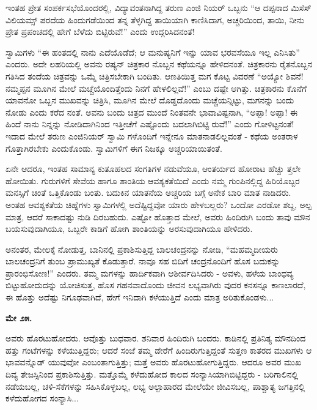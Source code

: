 ಇಂತಹ ಪ್ರೇತ ಸಂಪರ್ಕಸಭೆಯೊಂದರಲ್ಲಿ, ವಿದ್ಯಾವಂತನಾಗಿದ್ದ ತರುಣ ಎಂಜಿ ನಿಯರ್ ಒಬ್ಬನು “ಆ ದಪ್ಪನಾದ ಮಿಸೆಸ್ ವಿಲಿಯಮ್ಸ್ ಪರದೆಯ ಹಿಂದುಗಡೆಯಿಂದ ತನ್ನ ತೆಳ್ಳಗಿದ್ದ ತಾಯಿಯಾಗಿ ಕಾಣಿಸಿದಾಗ, ಅಚ್ಚರಿಯಿಂದ, ತಾಯಿ, ನೀನು ಪ್ರೇತ ಪ್ರಪಂಚದಲ್ಲಿ ಹೇಗೆ ಬೆಳೆದು ಬಿಟ್ಟಿರುವೆ!” ಎಂದು ಉದ್ಗರಿಸಿದನಂತೆ!

ಸ್ವಾಮಿಗಳು “ಈ ಹಂತದಲ್ಲಿ ನಾನು ಎದೆಯೊಡೆದೆ; ಆ ಮನುಷ್ಯನಿಗೆ ಇನ್ನು ಯಾವ ಭರವಸೆಯೂ ಇಲ್ಲ ಎನಿಸಿತು” ಎಂದರು. ಅದೇ ಲಹರಿಯಲ್ಲಿ ಅವನು ರಷ್ಯನ್ ಚಿತ್ರಕಾರ ನೊಬ್ಬನ ಕಥೆಯನ್ನೂ ಹೇಳಿದನಂತೆ. ಚಿತ್ರಕಾರನು ರೈತನೊಬ್ಬನ ಗತಿಸಿದ ತಂದೆಯ ಚಿತ್ರವನ್ನು ಒಮ್ಮೆ ಚಿತ್ರಿಸಬೇಕಾಗಿ ಬಂದಿತು. ಆಣತಿಯಿತ್ತ ಮಗ ಕೊಟ್ಟ ವಿವರಣೆ “ಅಯ್ಯೋ ಶಿವನೆ! ನಮ್ಮಪ್ಪನ ಮೂಗಿನ ಮೇಲೆ ಮಚ್ಚೆಯೊಂದಿತ್ತೆಂದು ನಿನಗೆ ಹೇಳಲಿಲ್ಲವೆ!” ಎಂಬು ದಷ್ಟೇ ಆಗಿತ್ತು. ಚಿತ್ರಕಾರನು ಕೊನೆಗೆ ಯಾವನೋ ಒಬ್ಬನ ಮುಖವನ್ನು ಚಿತ್ರಿಸಿ, ಮೂಗಿನ ಮೇಲೆ ದೊಡ್ಡದೊಂದು ಮಚ್ಚೆಯನ್ನಿಟ್ಟು, ಮಗನನ್ನು ಬಂದು ನೋಡು ಎಂದು ಕರೆದ ನಂತೆ. ಅವನು ಬಂದು ಚಿತ್ರದ ಮುಂದೆ ನಿಂತವನೇ ಭಾವಾವಿಷ್ಟನಾಗಿ, “ಅಪ್ಪಾ! ಅಪ್ಪಾ! ಈ ಹಿಂದೆ ನಾನು ನಿನ್ನನ್ನು ನೋಡಿದಾಗಿನಿಂದ ಇತ್ತೀಚೆಗೆ ಎಷ್ಟೊಂದು ಬದಲಾಗಿಬಿಟ್ಟಿ ರುವೆ!” ಎಂದು ಗೋಳಿಟ್ಟನಂತೆ! ಇದಾದ ಮೇಲೆ ತರುಣ ಎಂಜಿನಿಯರ್ ಸ್ವಾಮಿ ಗಳೊಂದಿಗೆ ಇನ್ನೇನೂ ಮಾತನಾಡಲಿಲ್ಲವಂತೆ - ಕಥೆಯ ಅಂತರಾಳ ಗೊತ್ತಾಗಿರಬೇಕು ಎಂದುಕೊಂಡು. ಸ್ವಾಮಿಗಳಿಗೆ ಈಗ ನಿಜಕ್ಕೂ ಅಚ್ಚರಿಯಾಯಿತಂತೆ.

ಏನೇ ಆದರೂ, ಇಂತಹ ಸಾಮಾನ್ಯ ಕುತೂಹಲದ ಸಂಗತಿಗಳ ನಡುವೆಯೂ, ಆಂತರ್ಯದ ಹೋರಾಟ ಹೆಚ್ಚು ತ್ತಲೇ ಹೋಯಿತು. ಗುರುಗಳಿಗೆ ಸೇವೆಯ ಹಾಗೂ ಶಾಂತಿಯ ಆವಶ್ಯಕತೆಯಿದೆ ಎಂದು ನಮ್ಮ ಗುಂಪಿನಲ್ಲಿದ್ದ ಹಿರಿಯೊಬ್ಬರ ಮನಸ್ಸಿಗೆ ಚಿಂತೆ ಒತ್ತಿಕೊಂಡು ಬಂತು. ಬದುಕಿನ ಯಾತನೆಯ ಅಚ್ಚರಿಯ ಬಗ್ಗೆ ಅನೇಕ ಬಾರಿ ಮಾತ ನಾಡಿದರು. ಅಂತಹ ಆವಶ್ಯಕತೆಯ ಚಿಹ್ನೆಗಳು ಸ್ವಾಮಿಗಳಲ್ಲಿ ಅದೆಷ್ಟಿದ್ದವೋ ಯಾರು ಹೇಳಬಲ್ಲರು? ಒಂದೋ ಎರಡೋ ಶಬ್ದ, ಅಲ್ಪ ಮಾತ್ರ, ಆದರೆ ಸಾಕಾದಷ್ಟು ನುಡಿ ದಿರಬಹುದು. ಎಷ್ಟೋ ಹೊತ್ತಾದ ಮೇಲೆ, ಅವರು ಹಿಂದಿರುಗಿ ಬಂದು ತಾವು ಮೌನ ಬಯಸುವುದಾಗಿಯೂ, ಒಬ್ಬರೇ ಕಾಡಿಗೆ ಹೋಗಿ ಶಾಂತಿಯನ್ನು ಅರಸುವುದಾಗಿಯೂ ಹೇಳಿದರು.

ಅನಂತರ, ಮೇಲಕ್ಕೆ ನೋಡುತ್ತ, ಬಾನಿನಲ್ಲಿ ಪ್ರಕಾಶಿಸುತ್ತಿದ್ದ ಬಾಲಚಂದ್ರನನ್ನು ನೋಡಿ, “ಮಹಮ್ಮದೀಯರು ಬಾಲಚಂದ್ರನಿಗೆ ತುಂಬ ಪ್ರಾಮುಖ್ಯತೆ ಕೊಡುತ್ತಾರೆ. ನಾವೂ ಸಹ ಬಿದಿಗೆ ಚಂದ್ರನೊಂದಿಗೆ ಹೊಸ ಬದುಕನ್ನು ಪ್ರಾರಂಭಿಸೋಣ!” ಎಂದರು. ತಮ್ಮ ಮಗಳನ್ನು ಹಾರ್ದಿಕವಾಗಿ ಆಶೀರ್ವದಿಸಿದರು - ಅವಳು, ಹಳೆಯ ಬಾಂಧವ್ಯ ಬಿಟ್ಟುಹೋದುದನ್ನು ಯೋಚಿಸುತ್ತ, ಹೊಸ ಗಹನವಾದೊಂದು ಜೀವನ ಲಭ್ಯವಾಗಿರು ವುದರ ಕನಸನ್ನೂ ಕಾಣಲಾರದೆ, ಈ ಹೊತ್ತು ಅದೆಷ್ಟು ನಿಗೂಢವಾಗಿದೆ, ಹೇಗೆ ಇನಿದಾಗಿ ಕಳೆಯುತ್ತಿದೆ ಎಂದು ಮಾತ್ರ ಅರಿತುಕೊಂಡಳು...

\textbf{ಮೇ ೨೫.}

ಅವರು ಹೊರಟುಹೋದರು. ಆವೊತ್ತು ಬುಧವಾರ. ಶನಿವಾರ ಹಿಂದಿರುಗಿ ಬಂದರು. ಕಾಡಿನಲ್ಲಿ ಪ್ರತಿನಿತ್ಯ ಮೌನದಿಂದ ಹತ್ತು ಗಂಟೆಗಳನ್ನು ಕಳೆಯುತ್ತಿದ್ದರು; ಆದರೆ ಸಂಜೆ ತಮ್ಮ ಡೇರೆಗೆ ಹಿಂದಿರುಗುತ್ತಿದ್ದಂತೆ ಸುತ್ತಣ ಕಾತರದ ಮುಖಗಳು ಆ ಭಾವವನ್ನೊಡ್ ಯುವುವೋ ಎಂಬಂತಾಗುತ್ತಿತ್ತು; ಮತ್ತೆ ಅವರು ಹೊರಟುಹೋಗುತ್ತಿದ್ದರು. ಆದರೂ ಅವರ ಮುಖ ದಿವ್ಯ ತೇಜಸ್ಸಿನಿಂದ ಪ್ರಕಾಶಿಸುತ್ತಿತ್ತು. ಮತ್ತೊಮ್ಮೆ ಕಳೆದುಹೋದ ಕಾಲದ ಸಂನ್ಯಾಸಿಯಾಗಿಬಿಟ್ಟಿದ್ದರು - ಬರಿಗಾಲಿನಲ್ಲಿ ನಡೆಯಬಲ್ಲ, ಚಳಿ-ಸೆಕೆಗಳನ್ನು ಸಹಿಸಿಕೊಳ್ಳಬಲ್ಲ, ಲಭ್ಯ ಅಲ್ಪಾಹಾರದ ಮೇಲೆಯೇ ಜೀವಿಸಬಲ್ಲ, ಪಾಶ್ಚಾತ್ಯ ಜಗತ್ತಿನಲ್ಲಿ ಕಳೆದುಹೋಗದ ಸಂನ್ಯಾಸಿ...

